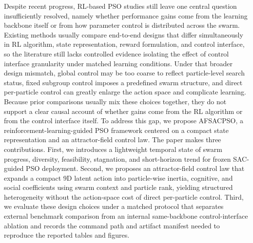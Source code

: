 \documentclass[final,5p,times]{elsarticle}
\begin{document}
Despite recent progress, RL-based PSO studies still leave one central question insufficiently resolved, namely whether performance gains come from the learning backbone itself or from how parameter control is distributed across the swarm.
Existing methods usually compare end-to-end designs that differ simultaneously in RL algorithm, state representation, reward formulation, and control interface, so the literature still lacks controlled evidence isolating the effect of control interface granularity under matched learning conditions.
Under that broader design mismatch, global control may be too coarse to reflect particle-level search status, fixed subgroup control imposes a predefined swarm structure, and direct per-particle control can greatly enlarge the action space and complicate learning.
Because prior comparisons usually mix these choices together, they do not support a clear causal account of whether gains come from the RL algorithm or from the control interface itself.
To address this gap, we propose AFSACPSO, a reinforcement-learning-guided PSO framework centered on a compact state representation and an attractor-field control law.
The paper makes three contributions. 
First, we introduces a lightweight temporal state of swarm progress, diversity, feasibility, stagnation, and short-horizon trend for frozen SAC-guided PSO deployment. 
Second, we proposes an attractor-field control law that expands a compact 9D latent action into particle-wise inertia, cognitive, and social coefficients using swarm context and particle rank, yielding structured heterogeneity without the action-space cost of direct per-particle control. 
Third, we evaluate these design choices under a matched protocol that separates external benchmark comparison from an internal same-backbone control-interface ablation and records the command path and artifact manifest needed to reproduce the reported tables and figures.
\end{document}
